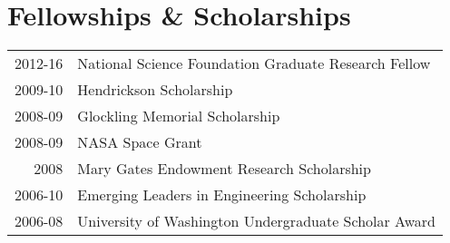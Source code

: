 \documentclass[a4paper,10pt]{article} %
\begin{document}
\FloatBarrier


\section{Fellowships \& Scholarships}

\begin{table}[h]
\begin{tabular}{rl}
\textsc{2012-16} & National Science Foundation Graduate Research Fellow\\
\textsc{2009-10} & Hendrickson Scholarship\\
\textsc{2008-09} & Glockling Memorial Scholarship\\
\textsc{2008-09} & NASA Space Grant\\
\textsc{2008} & Mary Gates Endowment Research Scholarship\\
\textsc{2006-10} & Emerging Leaders in Engineering Scholarship\\
\textsc{2006-08} & University of Washington Undergraduate Scholar Award\\
\end{tabular}
\end{table}

\FloatBarrier




\end{document}
